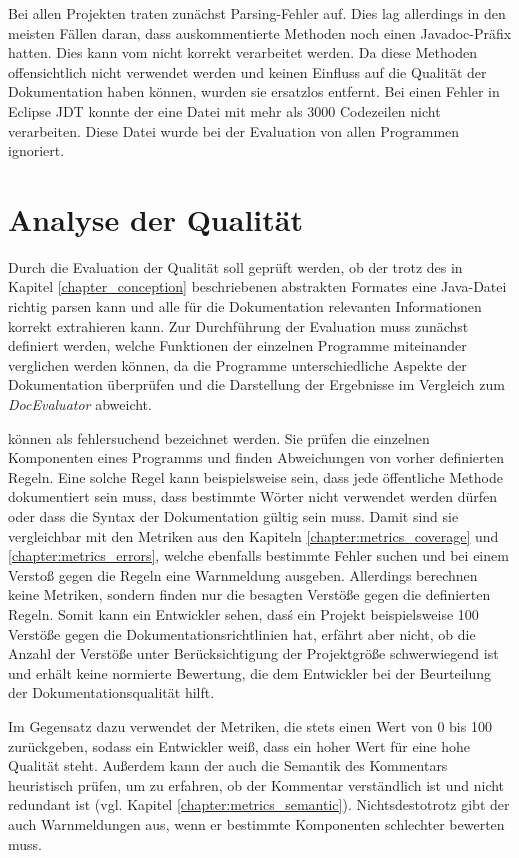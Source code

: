  Bei allen Projekten traten zunächst Parsing-Fehler auf. Dies lag allerdings in den meisten Fällen daran, dass auskommentierte Methoden noch einen Javadoc-Präfix hatten. Dies kann vom \doceval nicht korrekt verarbeitet werden. Da diese Methoden offensichtlich nicht verwendet werden und keinen Einfluss auf die Qualität der Dokumentation haben können, wurden sie ersatzlos entfernt. Bei einen Fehler in Eclipse \ac{JDT} konnte der \doceval eine Datei mit mehr als 3000 Codezeilen nicht verarbeiten. Diese Datei wurde bei der Evaluation von allen Programmen ignoriert.
\section{Analyse der Qualität}\label{chapter:quality}
Durch die Evaluation der Qualität soll geprüft werden, ob der \doceval trotz des in Kapitel \ref{chapter_conception}
 beschriebenen abstrakten Formates eine Java-Datei richtig parsen kann und alle für die Dokumentation relevanten Informationen korrekt extrahieren kann. Zur Durchführung der Evaluation muss zunächst definiert werden, welche Funktionen der einzelnen Programme miteinander verglichen werden können, da die Programme unterschiedliche Aspekte der Dokumentation überprüfen und die Darstellung der Ergebnisse im Vergleich zum \textit{DocEvaluator} abweicht.

\checkpmd können als fehlersuchend bezeichnet werden. Sie prüfen die einzelnen Komponenten eines Programms und finden Abweichungen von vorher definierten Regeln. Eine solche Regel kann beispielsweise sein, dass jede öffentliche Methode dokumentiert sein muss, dass bestimmte Wörter nicht verwendet werden dürfen oder dass die Syntax der Dokumentation gültig sein muss. Damit sind sie vergleichbar mit den Metriken aus den Kapiteln \ref{chapter:metrics_coverage}  und \ref{chapter:metrics_errors}, welche ebenfalls bestimmte Fehler suchen und bei einem Verstoß gegen die Regeln eine Warnmeldung ausgeben. Allerdings berechnen \checkpmd keine Metriken, sondern finden nur die besagten Verstöße gegen die definierten Regeln. Somit kann ein Entwickler sehen, dasś ein Projekt beispielsweise 100 Verstöße gegen die Dokumentationsrichtlinien hat, erfährt aber nicht, ob die Anzahl der Verstöße unter Berücksichtigung der Projektgröße schwerwiegend ist und erhält keine normierte Bewertung, die dem Entwickler bei der Beurteilung der Dokumentationsqualität hilft. 

Im Gegensatz dazu verwendet der \doceval Metriken, die stets einen Wert von 0 bis 100 zurückgeben, sodass ein Entwickler weiß, dass ein hoher Wert für eine hohe Qualität steht. Außerdem kann der \doceval auch die Semantik des Kommentars heuristisch prüfen, um zu erfahren, ob der Kommentar verständlich ist und nicht redundant ist (vgl. Kapitel \ref{chapter:metrics_semantic}). Nichtsdestotrotz gibt der \doceval auch Warnmeldungen aus, wenn er bestimmte Komponenten schlechter bewerten muss.

